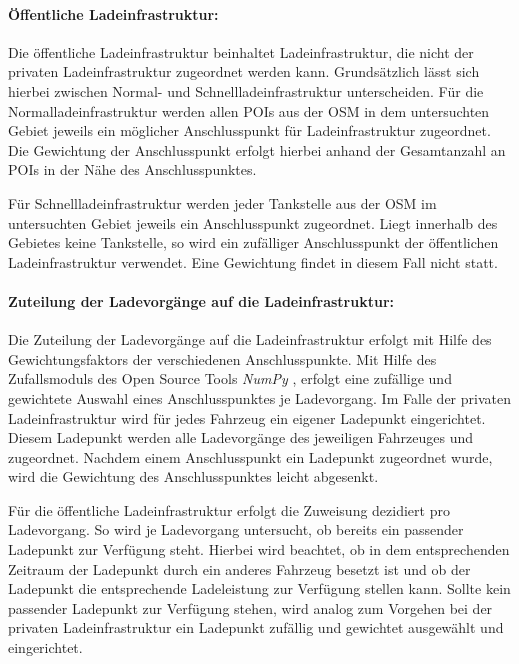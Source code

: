 \paragraph{Öffentliche Ladeinfrastruktur:}

Die öffentliche Ladeinfrastruktur beinhaltet Ladeinfrastruktur, die nicht der privaten Ladeinfrastruktur zugeordnet werden kann.
Grundsätzlich lässt sich hierbei zwischen Normal- und Schnellladeinfrastruktur unterscheiden.
Für die Normalladeinfrastruktur werden allen \glspl{POI} aus der \gls{OSM} \cite{OpenStreetMapFoundation} in dem untersuchten Gebiet jeweils ein möglicher Anschlusspunkt für Ladeinfrastruktur zugeordnet.
Die Gewichtung der Anschlusspunkt erfolgt hierbei anhand der Gesamtanzahl an \glspl{POI} in der Nähe des Anschlusspunktes.\medskip

Für Schnellladeinfrastruktur werden jeder Tankstelle aus der \gls{OSM} \cite{OpenStreetMapFoundation} im untersuchten Gebiet jeweils ein Anschlusspunkt zugeordnet.
Liegt innerhalb des Gebietes keine Tankstelle, so wird ein zufälliger Anschlusspunkt der öffentlichen Ladeinfrastruktur verwendet.
Eine Gewichtung findet in diesem Fall nicht statt.


\paragraph{Zuteilung der Ladevorgänge auf die Ladeinfrastruktur:}

Die Zuteilung der Ladevorgänge auf die Ladeinfrastruktur erfolgt mit Hilfe des Gewichtungsfaktors der verschiedenen Anschlusspunkte.
Mit Hilfe des Zufallsmoduls des Open Source Tools \textit{NumPy} \cite{harris2020array}, erfolgt eine zufällige und gewichtete Auswahl eines Anschlusspunktes je Ladevorgang.
Im Falle der privaten Ladeinfrastruktur wird für jedes Fahrzeug ein eigener Ladepunkt eingerichtet.
Diesem Ladepunkt werden alle Ladevorgänge des jeweiligen Fahrzeuges und \UCs zugeordnet.
Nachdem einem Anschlusspunkt ein Ladepunkt zugeordnet wurde, wird die Gewichtung des Anschlusspunktes leicht abgesenkt.\medskip

Für die öffentliche Ladeinfrastruktur erfolgt die Zuweisung dezidiert pro Ladevorgang.
So wird je Ladevorgang untersucht, ob bereits ein passender Ladepunkt zur Verfügung steht.
Hierbei wird beachtet, ob in dem entsprechenden Zeitraum der Ladepunkt durch ein anderes Fahrzeug besetzt ist und ob der Ladepunkt die entsprechende Ladeleistung zur Verfügung stellen kann.
Sollte kein passender Ladepunkt zur Verfügung stehen, wird analog zum Vorgehen bei der privaten Ladeinfrastruktur ein Ladepunkt zufällig und gewichtet ausgewählt und eingerichtet.


